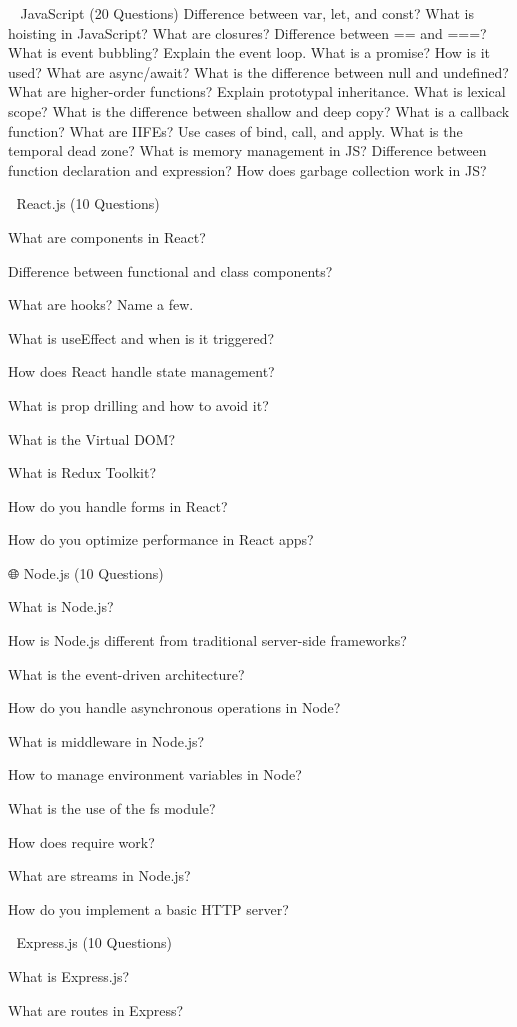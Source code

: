 👨‍💻 JavaScript (20 Questions)
Difference between var, let, and const?
What is hoisting in JavaScript?
What are closures?
Difference between == and ===?
What is event bubbling?
Explain the event loop.
What is a promise? How is it used?
What are async/await?
What is the difference between null and undefined?
What are higher-order functions?
Explain prototypal inheritance.
What is lexical scope?
What is the difference between shallow and deep copy?
What is a callback function?
What are IIFEs?
Use cases of bind, call, and apply.
What is the temporal dead zone?
What is memory management in JS?
Difference between function declaration and expression?
How does garbage collection work in JS?

📓 React.js (10 Questions)

What are components in React?

Difference between functional and class components?

What are hooks? Name a few.

What is useEffect and when is it triggered?

How does React handle state management?

What is prop drilling and how to avoid it?

What is the Virtual DOM?

What is Redux Toolkit?

How do you handle forms in React?

How do you optimize performance in React apps?

🌐 Node.js (10 Questions)

What is Node.js?

How is Node.js different from traditional server-side frameworks?

What is the event-driven architecture?

How do you handle asynchronous operations in Node?

What is middleware in Node.js?

How to manage environment variables in Node?

What is the use of the fs module?

How does require work?

What are streams in Node.js?

How do you implement a basic HTTP server?

🔹 Express.js (10 Questions)

What is Express.js?

What are routes in Express?

